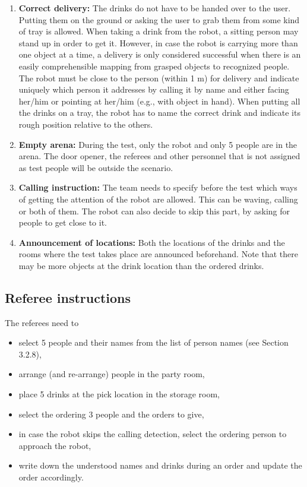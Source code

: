 \begin{enumerate}
	\item \textbf{Correct delivery:} The drinks do not have to be handed over to the user. Putting them on the ground or asking the user to grab them from some kind of tray is allowed. When taking a drink from the robot, a sitting person may stand up in order to get it. However, in case the robot is carrying more than one object at a time, a delivery is only considered successful when there is an easily comprehensible mapping from grasped objects to recognized people. The robot must be close to the person (within 1 m) for delivery and indicate uniquely which person it addresses by calling it by name and either facing her/him or pointing at her/him (e.g., with object in hand). When putting all the drinks on a tray, the robot has to name the correct drink and indicate its rough position relative to the others.

	\item \textbf{Empty arena:} During the test, only the robot and only 5 people are in the arena. The door opener, the referees and other personnel that is not assigned as test people will be outside the scenario.

	\item \textbf{Calling instruction:} The team needs to specify before the test which ways of getting the attention of the robot are allowed. This can be waving, calling or both of them. The robot can also decide to skip this part, by asking for people to get close to it.

	\item \textbf{Announcement of locations:} Both the locations of the drinks and the rooms where the test takes place are announced beforehand. Note that there may be more objects at the drink location than the ordered drinks.
\end{enumerate}

\subsection{Referee instructions}

The referees need to
\begin{itemize}
	\item select 5 people and their names from the list of person names (see Section 3.2.8),
	\item arrange (and re-arrange) people in the party room,
	\item place 5 drinks at the pick location in the storage room,
	\item select the ordering 3 people and the orders to give,
	\item in case the robot skips the calling detection, select the ordering person to approach the robot,
	\item write down the understood names and drinks during an order and update the order accordingly.
\end{itemize}

